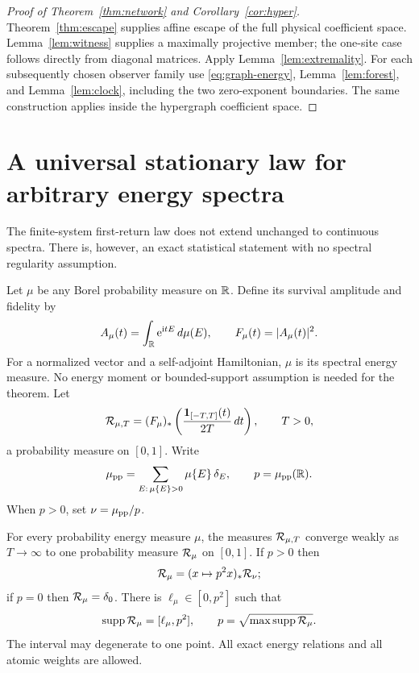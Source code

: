 \begin{proof}[Proof of Theorem~\ref{thm:network} and
Corollary~\ref{cor:hyper}]
Theorem~\ref{thm:escape} supplies affine escape of the full physical
coefficient space. Lemma~\ref{lem:witness} supplies a maximally
projective member; the one-site case follows directly from diagonal
matrices. Apply Lemma~\ref{lem:extremality}. For each subsequently
chosen observer family use \eqref{eq:graph-energy},
Lemma~\ref{lem:forest}, and Lemma~\ref{lem:clock}, including the two
zero-exponent boundaries. The same construction applies inside the
hypergraph coefficient space.
\end{proof}

\section{A universal stationary law for arbitrary energy spectra}

The finite-system first-return law does not extend unchanged to
continuous spectra. There is, however, an exact statistical statement
with no spectral regularity assumption.

Let $\mu$ be any Borel probability measure on $\mathbb R$. Define its
survival amplitude and fidelity by
\[
 A_\mu(t)=\int_\mathbb R\mathrm e^{\mathrm i tE}\,d\mu(E),\qquad
 F_\mu(t)=|A_\mu(t)|^2.
\]
For a normalized vector and a self-adjoint Hamiltonian, $\mu$ is its
spectral energy measure. No energy moment or bounded-support assumption
is needed for the theorem. Let
\[
 \mathcal R_{\mu,T}=(F_\mu)_*
       \left(\frac{\mathbf1_{[-T,T]}(t)}{2T}\,dt\right),\qquad T>0,
\]
a probability measure on $[0,1]$. Write
\[
 \mu_{\mathrm{pp}}=\sum_{E:\,\mu\{E\}>0}\mu\{E\}\,\delta_E,\qquad
 p=\mu_{\mathrm{pp}}(\mathbb R).
\]
When $p>0$, set $\nu=\mu_{\mathrm{pp}}/p$.

\begin{theorem}
\label{thm:stationary}
For every probability energy measure $\mu$, the measures
$\mathcal R_{\mu,T}$ converge weakly as $T\to\infty$ to one probability
measure $\mathcal R_\mu$ on $[0,1]$. If $p>0$ then
\begin{equation}
 \mathcal R_\mu=(x\mapsto p^2x)_*\mathcal R_\nu;
 \label{eq:scaling}
\end{equation}
if $p=0$ then $\mathcal R_\mu=\delta_0$.
There is $\ell_\mu\in[0,p^2]$ such that
\begin{equation}
 \operatorname{supp}\mathcal R_\mu=[\ell_\mu,p^2],
 \qquad
 p=\sqrt{\max\operatorname{supp}\mathcal R_\mu}.
 \label{eq:edge}
\end{equation}
The interval may degenerate to one point. All exact energy relations
and all atomic weights are allowed.
\end{theorem}

